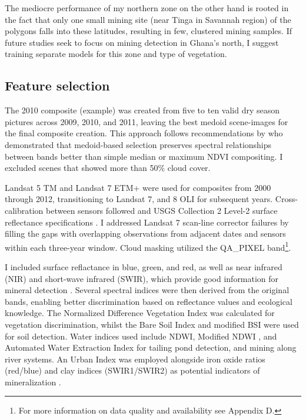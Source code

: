 \documentclass[]{interact}
\begin{document}
The mediocre performance of my northern zone on the other hand is rooted in the fact that only one small mining site (near Tinga in Savannah region) of the \citet{maus2020globalscale} polygons falls into these latitudes, resulting in few, clustered mining samples. If future studies seek to focus on mining detection in Ghana's north, I suggest training separate models for this zone and type of vegetation.

\subsection{Feature selection}
\label{app:features}
The 2010 composite (example) was created from five to ten valid dry season pictures across 2009, 2010, and 2011, leaving the best medoid scene-images for the final composite creation. This approach follows recommendations by \citet{flood2013Seasonal} who demonstrated that medoid-based selection preserves spectral relationships between bands better than simple median or maximum NDVI compositing. I excluded scenes that showed more than 50\% cloud cover.

Landsat 5 TM and Landsat 7 ETM+ were used for composites from 2000 through 2012, transitioning to Landsat 7, and 8 OLI for subsequent years. Cross-calibration between sensors followed \citet{roy2016Characterization} and USGS Collection 2 Level-2 surface reflectance specifications \citep{usgs2022Landsat}. I addressed Landsat 7 scan-line corrector failures by filling the gaps with overlapping observations from adjacent dates and sensors within each three-year window. Cloud masking utilized the QA\_PIXEL band\footnote{For more information on data quality and availability see Appendix D.}.

I included surface reflactance in blue, green, and red, as well as near infrared (NIR) and short-wave infrared (SWIR), which provide good information for mineral detection \citep{koerting2024VNIRSWIR}. Several spectral indices were then derived from the original bands, enabling better discrimination based on reflectance values and ecological knowledge. The Normalized Difference Vegetation Index \citep[NDVI;][]{tucker1979Red,rouse1973Monitoring} was calculated for vegetation discrimination, whilst the Bare Soil Index \citep[BSI;][]{rikimaru2002Tropical} and modified BSI \citep{nguyen2021Modified} were used for soil detection. Water indices used include NDWI, Modified NDWI \citep[MNDWI;][]{xu2006Modification}, and Automated Water Extraction Index \citep[AWEI;][]{feyisa2014Automated} for tailing pond detection, and mining along river systems. An Urban Index \citep[UI;][]{javed2021Review} was employed alongside iron oxide ratios (red/blue) and clay indices (SWIR1/SWIR2) as potential indicators of mineralization \citep{barenblitt2021large}.
\end{document}
